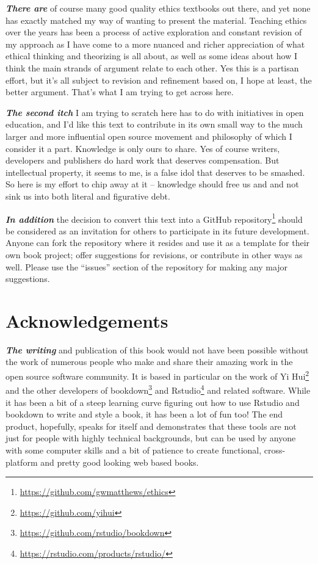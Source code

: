 \documentclass[12pt, openany]{book}
\renewcommand{\href}[2]{#2\footnote{\url{#1}}}
\begin{document}
\textbf{\emph{There are}} of course many good quality ethics textbooks out there, and yet none has exactly matched my way of wanting to present the material. Teaching ethics over the years has been a process of active exploration and constant revision of my approach as I have come to a more nuanced and richer appreciation of what ethical thinking and theorizing is all about, as well as some ideas about how I think the main strands of argument relate to each other. Yes this is a partisan effort, but it's all subject to revision and refinement based on, I hope at least, the better argument. That's what I am trying to get across here.

\textbf{\emph{The second itch}} I am trying to scratch here has to do with initiatives in open education, and I'd like this text to contribute in its own small way to the much larger and more influential open source movement and philosophy of which I consider it a part. Knowledge is only ours to share. Yes of course writers, developers and publishers do hard work that deserves compensation. But intellectual property, it seems to me, is a false idol that deserves to be smashed. So here is my effort to chip away at it -- knowledge should free us and and not sink us into both literal and figurative debt.

\textbf{\emph{In addition}} the decision to convert this text into a \href{https://github.com/gwmatthews/ethics}{GitHub repository} should be considered as an invitation for others to participate in its future development. Anyone can fork the repository where it resides and use it as a template for their own book project; offer suggestions for revisions, or contribute in other ways as well. Please use the ``issues'' section of the repository for making any major suggestions.

\hypertarget{acknowledgements}{%
\section*{Acknowledgements}\label{acknowledgements}}


\textbf{\emph{The writing}} and publication of this book would not have been possible without the work of numerous people who make and share their amazing work in the open source software community. It is based in particular on the work of \href{https://github.com/yihui}{Yi Hui} and the other developers of \href{https://github.com/rstudio/bookdown}{bookdown} and \href{https://rstudio.com/products/rstudio/}{Rstudio} and related software. While it has been a bit of a steep learning curve figuring out how to use Rstudio and bookdown to write and style a book, it has been a lot of fun too! The end product, hopefully, speaks for itself and demonstrates that these tools are not just for people with highly technical backgrounds, but can be used by anyone with some computer skills and a bit of patience to create functional, cross-platform and pretty good looking web based books.
\end{document}
